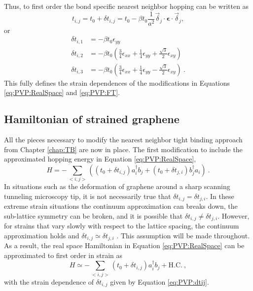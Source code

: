 Thus, to first order the bond specific nearest neighbor hopping can be written as
\begin{equation*}
  t_{i,j}=t_0+\delta t_{i,j}=t_0-\beta t_0 \frac{1}{a^2} \vec{\delta}_{j} \cdot \bm{\epsilon} \cdot \vec{\delta}_{j},
\end{equation*}
or
\begin{align}
  \delta t_{i,1}&=-\beta t_0 \epsilon_{yy} \nonumber \\
  \delta t_{i,2}&=-\beta t_0 \left( \frac{3}{4}\epsilon_{xx} +\frac{1}{4} \epsilon_{yy} + \frac{\sqrt{3}}{2} \epsilon_{xy} \right) \nonumber \\
  \delta t_{i,3}&=-\beta t_0 \left( \frac{3}{4}\epsilon_{xx} +\frac{1}{4} \epsilon_{yy} - \frac{\sqrt{3}}{2} \epsilon_{xy} \right)  \label{eq:PVP:dtij}\ .
\end{align}
This fully defines the strain dependences of the modifications in Equations \ref{eq:PVP:RealSpace} and \ref{eq:PVP:FT}.

\subsection{Hamiltonian of strained graphene}
All the pieces necessary to modify the nearest neighbor tight binding approach from Chapter \ref{chap:TB} are now in place.
The first modification to include the approximated hopping energy in Equation \ref{eq:PVP:RealSpace},
\begin{equation*}
  H=-\sum_{<i,j>} \left( (t_0+\delta t_{i,j})  a_i^{\dagger} b_j + (t_0+\delta t_{j,i}) b_j^{\dagger} a_i \right) \ .
\end{equation*}
In situations such as the deformation of graphene around a sharp scanning tunneling microscopy tip, it is not necessarily true that $\delta t_{i,j} = \delta t_{j,i}$.
In these extreme strain situations the continuum approximation can breaks down, the sub-lattice symmetry can be broken, and it is possible that $\delta t_{i,j} \neq \delta t_{j,i}$.
However, for strains that vary slowly with respect to the lattice spacing, the continuum approximation holds and $\delta t_{i,j} \simeq \delta t_{j,i}$ \cite{Sloan2013}.
This assumption will be made throughout.
As a result, the real space Hamiltonian in Equation \ref{eq:PVP:RealSpace} can be approximated to first order in strain as
\begin{equation*}
  H \simeq -\sum_{<i,j>} \left( t_0+\delta t_{i,j} \right)  a_i^{\dagger} b_j + \text{H.C.} \ ,
\end{equation*}
with the strain dependence of $\delta t_{i,j}$ given by Equation \ref{eq:PVP:dtij}.


